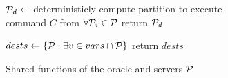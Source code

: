 \begin{algorithm}[h!]
  \footnotesize
  
  \begin{distribalgo}[1]  
    \STATE $\mathcal{P}_d \leftarrow$ deterministicly compute partition to execute\\ \hspace{8mm} command $C$ from $\forall \mathcal{P}_i \in \mathcal{P}$
    \STATE return $\mathcal{P}_d$
  \ENDINDENT	
  
  
  \vspace{1.0mm}
    \STATE $dests \leftarrow \{ \mathcal{P} : \exists v \in vars \cap \mathcal{P} \}$
    \STATE return $dests$
  \ENDINDENT
  
  \vspace{1.5mm}
  
  
  \caption{Shared functions of the oracle and servers $\mathcal{P}$}
  \label{alg:share_algo}
  \end{distribalgo}
  \end{algorithm}